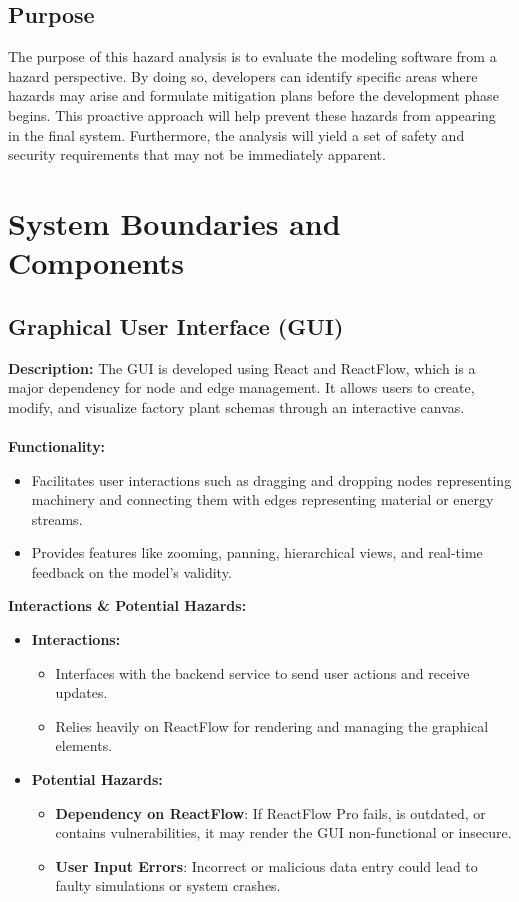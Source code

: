 \documentclass{article}
\begin{document}
\subsection{Purpose} The purpose of this hazard analysis is to evaluate the modeling software from a hazard perspective. By doing so, developers can identify specific areas where hazards may arise and formulate mitigation plans before the development phase begins. This proactive approach will help prevent these hazards from appearing in the final system. Furthermore, the analysis will yield a set of safety and security requirements that may not be immediately apparent.

\section{System Boundaries and Components}

\subsection{Graphical User Interface (GUI)}

\textbf{Description:}
The GUI is developed using React and ReactFlow, which is a major dependency for node and edge management. It allows users to create, modify, and visualize factory plant schemas through an interactive canvas.
\\\\
\textbf{Functionality:}
\begin{itemize}
    \item Facilitates user interactions such as dragging and dropping nodes representing machinery and connecting them with edges representing material or energy streams.
    \item Provides features like zooming, panning, hierarchical views, and real-time feedback on the model's validity.  
\end{itemize}
\textbf{Interactions \& Potential Hazards:}
\begin{itemize}
    \item \textbf{Interactions:}
    \begin{itemize}
        \item Interfaces with the backend service to send user actions and receive updates.
        \item Relies heavily on ReactFlow for rendering and managing the graphical elements.
    \end{itemize}
    \item \textbf{Potential Hazards:}
    \begin{itemize}
        \item \textbf{Dependency on ReactFlow}: If ReactFlow Pro fails, is outdated, or contains vulnerabilities, it may render the GUI non-functional or insecure.
        \item \textbf{User Input Errors}: Incorrect or malicious data entry could lead to faulty simulations or system crashes.
    \end{itemize}
\end{itemize}
\end{document}
